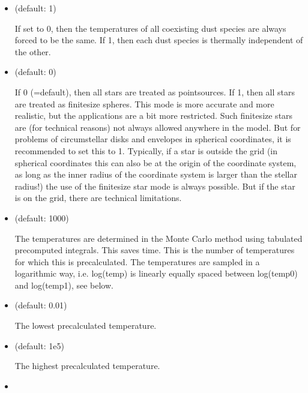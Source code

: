 \documentclass[letterpaper,10pt,english]{sphinxmanual}
\begin{document}
\begin{itemize}
\item {} 
 (default: 1)

If set to 0, then the temperatures of all coexisting dust species are
always forced to be the same. If 1, then each dust species is thermally
independent of the other.

\item {} 
 (default: 0)

If 0 (=default), then all stars are treated as point\sphinxhyphen{}sources. If 1, then
all stars are treated as finite\sphinxhyphen{}size spheres. This mode is more accurate
and more realistic, but the applications are a bit more restricted.
Such finite\sphinxhyphen{}size stars are (for technical reasons) not always allowed
anywhere in the model. But for problems of circumstellar disks and envelopes
in spherical coordinates, it is recommended to set this to 1. Typically,
if a star is outside the grid (in spherical coordinates this can also be
at the origin of the coordinate system, as long as the inner radius of
the coordinate system is larger than the stellar radius!) the use of the
finite\sphinxhyphen{}size star mode is always possible. But if the star is on the grid,
there are technical limitations.

\item {} 
 (default: 1000) 

The temperatures are determined in the Monte Carlo method using tabulated
pre\sphinxhyphen{}computed integrals. This saves time. This is the number of
temperatures for which this is precalculated. The temperatures are sampled
in a logarithmic way, i.e. log(temp) is linearly equally spaced between
log(temp0) and log(temp1), see below.

\item {} 
 (default: 0.01) 

The lowest pre\sphinxhyphen{}calculated temperature.

\item {} 
 (default: 1e5) 

The highest pre\sphinxhyphen{}calculated temperature.

\item {} 


\end{itemize}
\end{document}

